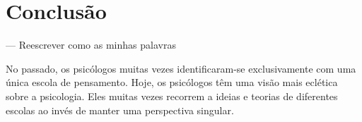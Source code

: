 \section{Conclusão}\label{conclusao}


--- Reescrever como as minhas palavras

No passado, os psicólogos muitas vezes identificaram-se exclusivamente com uma única escola de pensamento. Hoje, os psicólogos têm uma visão mais eclética sobre a psicologia. Eles muitas vezes recorrem a ideias e teorias de diferentes escolas ao invés de manter uma perspectiva singular.
